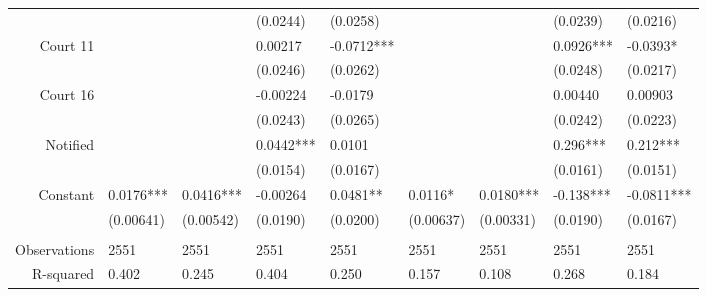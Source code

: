 \begin{tabular}{rrrrrrrrr}
      & \multicolumn{1}{l}{} & \multicolumn{1}{l}{} & \multicolumn{1}{l}{(0.0244)} & \multicolumn{1}{l}{(0.0258)} & \multicolumn{1}{l}{} & \multicolumn{1}{l}{} & \multicolumn{1}{l}{(0.0239)} & \multicolumn{1}{l}{(0.0216)} \\
Court 11 & \multicolumn{1}{l}{} & \multicolumn{1}{l}{} & \multicolumn{1}{l}{0.00217} & \multicolumn{1}{l}{-0.0712***} & \multicolumn{1}{l}{} & \multicolumn{1}{l}{} & \multicolumn{1}{l}{0.0926***} & \multicolumn{1}{l}{-0.0393*} \\
      & \multicolumn{1}{l}{} & \multicolumn{1}{l}{} & \multicolumn{1}{l}{(0.0246)} & \multicolumn{1}{l}{(0.0262)} & \multicolumn{1}{l}{} & \multicolumn{1}{l}{} & \multicolumn{1}{l}{(0.0248)} & \multicolumn{1}{l}{(0.0217)} \\
Court 16 & \multicolumn{1}{l}{} & \multicolumn{1}{l}{} & \multicolumn{1}{l}{-0.00224} & \multicolumn{1}{l}{-0.0179} & \multicolumn{1}{l}{} & \multicolumn{1}{l}{} & \multicolumn{1}{l}{0.00440} & \multicolumn{1}{l}{0.00903} \\
      & \multicolumn{1}{l}{} & \multicolumn{1}{l}{} & \multicolumn{1}{l}{(0.0243)} & \multicolumn{1}{l}{(0.0265)} & \multicolumn{1}{l}{} & \multicolumn{1}{l}{} & \multicolumn{1}{l}{(0.0242)} & \multicolumn{1}{l}{(0.0223)} \\
Notified & \multicolumn{1}{l}{} & \multicolumn{1}{l}{} & \multicolumn{1}{l}{0.0442***} & \multicolumn{1}{l}{0.0101} & \multicolumn{1}{l}{} & \multicolumn{1}{l}{} & \multicolumn{1}{l}{0.296***} & \multicolumn{1}{l}{0.212***} \\
      & \multicolumn{1}{l}{} & \multicolumn{1}{l}{} & \multicolumn{1}{l}{(0.0154)} & \multicolumn{1}{l}{(0.0167)} & \multicolumn{1}{l}{} & \multicolumn{1}{l}{} & \multicolumn{1}{l}{(0.0161)} & \multicolumn{1}{l}{(0.0151)} \\
Constant & \multicolumn{1}{l}{0.0176***} & \multicolumn{1}{l}{0.0416***} & \multicolumn{1}{l}{-0.00264} & \multicolumn{1}{l}{0.0481**} & \multicolumn{1}{l}{0.0116*} & \multicolumn{1}{l}{0.0180***} & \multicolumn{1}{l}{-0.138***} & \multicolumn{1}{l}{-0.0811***} \\
      & \multicolumn{1}{l}{(0.00641)} & \multicolumn{1}{l}{(0.00542)} & \multicolumn{1}{l}{(0.0190)} & \multicolumn{1}{l}{(0.0200)} & \multicolumn{1}{l}{(0.00637)} & \multicolumn{1}{l}{(0.00331)} & \multicolumn{1}{l}{(0.0190)} & \multicolumn{1}{l}{(0.0167)} \\
      & \multicolumn{1}{l}{} & \multicolumn{1}{l}{} & \multicolumn{1}{l}{} & \multicolumn{1}{l}{} & \multicolumn{1}{l}{} & \multicolumn{1}{l}{} & \multicolumn{1}{l}{} & \multicolumn{1}{l}{} \\
Observations & \multicolumn{1}{l}{2551} & \multicolumn{1}{l}{2551} & \multicolumn{1}{l}{2551} & \multicolumn{1}{l}{2551} & \multicolumn{1}{l}{2551} & \multicolumn{1}{l}{2551} & \multicolumn{1}{l}{2551} & \multicolumn{1}{l}{2551} \\
R-squared & \multicolumn{1}{l}{0.402} & \multicolumn{1}{l}{0.245} & \multicolumn{1}{l}{0.404} & \multicolumn{1}{l}{0.250} & \multicolumn{1}{l}{0.157} & \multicolumn{1}{l}{0.108} & \multicolumn{1}{l}{0.268} & \multicolumn{1}{l}{0.184} \\
\bottomrule
\end{tabular}%
